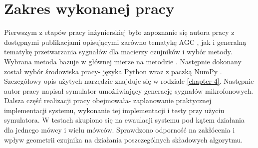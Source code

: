 \section{Zakres wykonanej pracy}
Pierwszym z etapów pracy inżynierskiej było zapoznanie się autora pracy z dostępnymi publikacjami opisującymi zarówno tematykę AGC \cite{Braun2014}, \cite{Archibald2008} jak i generalną tematykę przetwarzania sygnałów dla macierzy czujników \cite{Benesty2008} i wybór metody. Wybrana metoda bazuje w głównej mierze na metodzie \cite{Braun2014}.
Następnie dokonany został wybór środowiska pracy- języka Python wraz z paczką NumPy \cite{numpy}. Szczegółowy opis użytych narzędzie znajduje się w rodziale \ref{chapter-4}. Następnie autor pracy napisał symulator umożliwiający generację sygnałów mikrofonowych. Dalsza część realizacji pracy obejmowała- zaplanowanie praktycznej implementacji systemu, wykonanie tej implementacji i testy przy użyciu symulatora. W testach skupiono się na ewaulacji systemu pod kątem działania dla jednego mówcy i wielu mówców. Sprawdzono odporność na zakłócenia i wpływ geometrii czujnika na działania poszczególnych składowych algorytmu.

